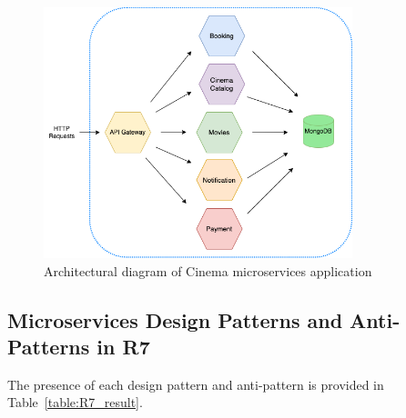 \documentclass{Configuration_Files/PoliMi3i_thesis}
\begin{document}
\begin{figure}[H]
\centering
\includegraphics[width=0.8\textwidth]{myImages/R7.png}
\caption{Architectural diagram of Cinema microservices application}
\label{fig:R7_arch}
\end{figure}

\subsection{Microservices Design Patterns and Anti-Patterns in R7}
\label{subsec:R7_detection}

The presence of each design pattern and anti-pattern is provided in Table~\ref{table:R7_result}.
\end{document}
